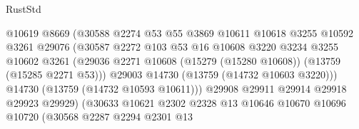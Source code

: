 \begin{lexlean}{RustStd}
\begin{coremodule}
                                      @10619
                                      @8669
                                      (@30588
                                        @2274
                                        @53
                                        @55
                                        @3869
                                        @10611
                                        @10618
                                        @3255
                                        @10592
                                        @3261
                                        @29076
                                        (@30587
                                          @2272
                                          @103
                                          @53
                                          @16
                                          @10608
                                          @3220
                                          @3234
                                          @3255
                                          @10602
                                          @3261
                                          (@29036
                                            @2271
                                            @10608
                                            (@15279 (@15280 @10608))
                                            (@13759 (@15285 @2271 @53)))
                                          @29003
                                          @14730
                                          (@13759 (@14732 @10603 @3220)))
                                        @14730
                                        (@13759 (@14732 @10593 @10611)))
                                      @29908
                                      @29911
                                      @29914
                                      @29918
                                      @29923
                                      @29929)
                                    (@30633
                                      @10621
                                      @2302
                                      @2328
                                      @13
                                      @10646
                                      @10670
                                      @10696
                                      @10720
                                      (@30568
                                        @2287
                                        @2294
                                        @2301
                                        @13

\end{coremodule}
\end{lexlean}
